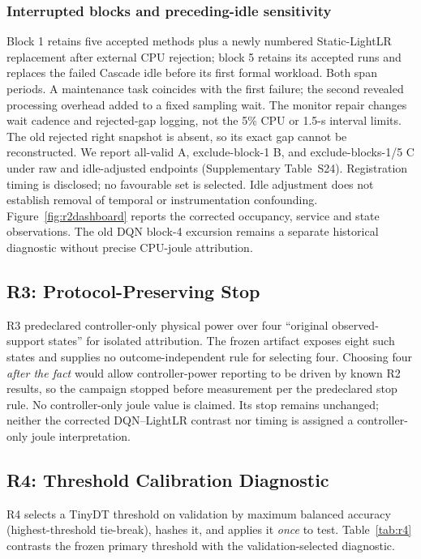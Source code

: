 \subsubsection*{Interrupted blocks and preceding-idle sensitivity}
Block 1 retains five accepted methods plus a newly numbered Static-LightLR replacement after external CPU rejection; block 5 retains its accepted runs and replaces the failed Cascade idle before its first formal workload. Both span periods. A maintenance task coincides with the first failure; the second revealed processing overhead added to a fixed sampling wait. The monitor repair changes wait cadence and rejected-gap logging, not the 5\% CPU or 1.5-s interval limits. The old rejected right snapshot is absent, so its exact gap cannot be reconstructed. We report all-valid A, exclude-block-1 B, and exclude-blocks-1/5 C under raw and idle-adjusted endpoints (Supplementary Table~S24). Registration timing is disclosed; no favourable set is selected. Idle adjustment does not establish removal of temporal or instrumentation confounding. Figure~\ref{fig:r2dashboard} reports the corrected occupancy, service and state observations. The old DQN block-4 excursion remains a separate historical diagnostic without precise CPU-joule attribution.

\subsection{R3: Protocol-Preserving Stop}
R3 predeclared controller-only physical power over four ``original observed-support states'' for isolated attribution. The frozen artifact exposes eight such states and supplies no outcome-independent rule for selecting four. Choosing four \emph{after the fact} would allow controller-power reporting to be driven by known R2 results, so the campaign stopped before measurement per the predeclared stop rule. No controller-only joule value is claimed. Its stop remains unchanged; neither the corrected DQN--LightLR contrast nor timing is assigned a controller-only joule interpretation.

\subsection{R4: Threshold Calibration Diagnostic}
R4 selects a TinyDT threshold on validation by maximum balanced accuracy (highest-threshold tie-break), hashes it, and applies it \emph{once} to test. Table~\ref{tab:r4} contrasts the frozen primary threshold with the validation-selected diagnostic.


